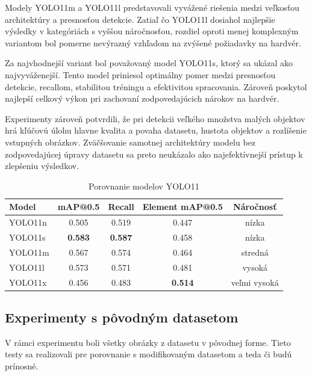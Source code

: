             Modely YOLO11m a YOLO11l predstavovali vyvážené riešenia medzi veľkosťou architektúry a presnosťou detekcie. Zatiaľ čo YOLO11l dosiahol najlepšie výsledky v kategóriách s vyššou náročnosťou, rozdiel oproti menej komplexným variantom bol pomerne nevýrazný vzhľadom na zvýšené požiadavky na hardvér.

            Za najvhodnejší variant bol považovaný model YOLO11s, ktorý sa ukázal ako najvyváženejší. Tento model priniesol optimálny pomer medzi presnosťou detekcie, recallom, stabilitou tréningu a efektivitou spracovania. Zároveň poskytol najlepší celkový výkon pri zachovaní zodpovedajúcich nárokov na hardvér.

            Experimenty zároveň potvrdili, že pri detekcii veľkého množstva malých objektov hrá kľúčovú úlohu hlavne kvalita a povaha datasetu, hustota objektov a rozlíšenie vstupných obrázkov. Zväčšovanie samotnej architektúry modelu bez zodpovedajúcej úpravy datasetu sa preto neukázalo ako najefektívnejší prístup k zlepšeniu výsledkov.

            \begin{table}[H]
                \centering
                \begin{tabular}{|l|c|c|c|c|}
                \hline
                \textbf{Model} & \textbf{mAP@0.5} & \textbf{Recall} & \textbf{Element mAP@0.5} & \textbf{Náročnosť} \\ \hline
                YOLO11n & 0.505 & 0.519 & 0.447 & nízka \\ \hline
                YOLO11s & \textbf{0.583} & \textbf{0.587} & 0.458 & nízka \\ \hline
                YOLO11m & 0.567 & 0.574 & 0.464 & stredná \\ \hline
                YOLO11l & 0.573 & 0.571 & 0.481 & vysoká \\ \hline
                YOLO11x & 0.456 & 0.483 & \textbf{0.514} & veľmi vysoká \\ \hline
                \end{tabular}
                \caption{Porovnanie modelov YOLO11}
                \label{tab:yolo_comparison}
            \end{table}
    \subsection{Experimenty s pôvodným datasetom}
    V rámci experimentu boli všetky obrázky z datasetu v pôvodnej forme. Tieto testy sa realizovali pre porovnanie s modifikovaným datasetom a teda či budú prínosné.
